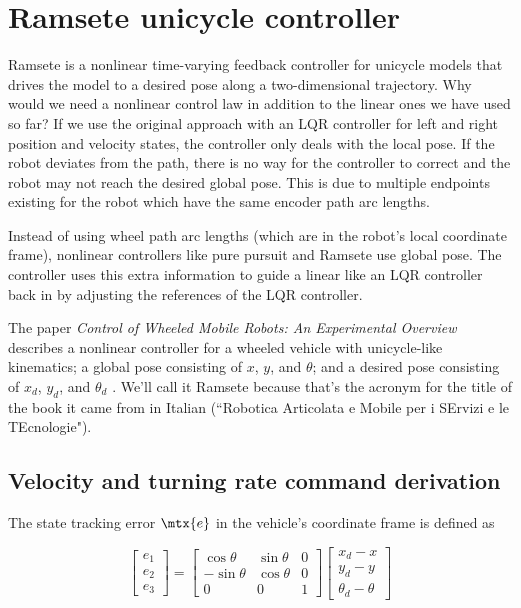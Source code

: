 \section{Ramsete unicycle controller}
\label{sec:ramsete_unicycle_controller}

Ramsete is a nonlinear time-varying feedback controller for unicycle
\glspl{model} that drives the \gls{model} to a desired \gls{pose} along a
two-dimensional trajectory. Why would we need a nonlinear control law in
addition to the linear ones we have used so far? If we use the original approach
with an LQR \gls{controller} for left and right position and velocity
\glspl{state}, the \gls{controller} only deals with the local \gls{pose}. If the
robot deviates from the path, there is no way for the \gls{controller} to
correct and the robot may not reach the desired global \gls{pose}. This is due
to multiple endpoints existing for the robot which have the same encoder path
arc lengths.

Instead of using wheel path arc lengths (which are in the robot's local
coordinate frame), nonlinear controllers like pure pursuit and Ramsete use
global pose. The \gls{controller} uses this extra information to guide a linear
 like an LQR \gls{controller} back in by
adjusting the \glspl{reference} of the LQR \gls{controller}.

The paper \textit{Control of Wheeled Mobile Robots: An Experimental Overview}
describes a nonlinear controller for a wheeled vehicle with unicycle-like
kinematics; a global \gls{pose} consisting of $x$, $y$, and $\theta$; and a
desired \gls{pose} consisting of $x_d$, $y_d$, and $\theta_d$
\cite{bib:ctrl_wheeled_mobile_robots}. We'll call it Ramsete because that's the
acronym for the title of the book it came from in Italian (``Robotica Articolata
e Mobile per i SErvizi e le TEcnologie").

\subsection{Velocity and turning rate command derivation}

The \gls{state} tracking \gls{error} $\mtx{e}$ in the vehicle's coordinate frame
is defined as

\begin{equation*}
  \begin{bmatrix}
    e_1 \\
    e_2 \\
    e_3
  \end{bmatrix} =
  \begin{bmatrix}
    \cos\theta & \sin\theta & 0 \\
    -\sin\theta & \cos\theta & 0 \\
    0 & 0 & 1
  \end{bmatrix}
  \begin{bmatrix}
    x_d - x \\
    y_d - y \\
    \theta_d - \theta
  \end{bmatrix}
\end{equation*}

